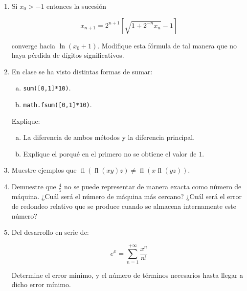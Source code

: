 \documentclass[
	spanish,
	9pt,
	utf8,
	xcolor=table,
	handout,
	aspectratio=1610,
	professionalfonts,
	notheorems,
	mathserif,
]{beamer}
\newcounter{savedenum}
\newcommand*{\resume}{\setcounter{enumi}{\thesavedenum}}
\begin{document}
\begin{frame}
	\begin{enumerate}
		\resume

		\item
		      Si $x_{0}>-1$ entonces la sucesión

		      \begin{equation*}
			      x_{n+1}=
			      2^{n+1}\left[\sqrt{1+2^{-n}x_{n}}-1\right]
		      \end{equation*}

		      converge hacia $\ln\left(x_{0}+1\right)$.
		      Modifique esta fórmula de tal manera que no haya pérdida de dígitos significativos.

		\item
		      En clase se ha visto distintas formas de sumar:

		      \begin{multicols}{2}
			      \begin{enumerate}[a)]
				      \item
				            \texttt{sum([0,1]*10)}.

				      \item
				            \texttt{math.fsum([0,1]*10)}.
			      \end{enumerate}
		      \end{multicols}

		      Explique:

		      \begin{multicols}{2}
			      \begin{enumerate}[a)]
				      \item La diferencia de ambos métodos y la diferencia principal.
				      \item Explique el porqué en el primero no se obtiene el valor de $1$.
			      \end{enumerate}
		      \end{multicols}

		\item
		      Muestre ejemplos que $\operatorname{fl}\left(\operatorname{fl}\left(xy\right)z\right)\neq\operatorname{fl}\left(x\operatorname{fl}\left(yz\right)\right)$.

		\item
		      Demuestre que $\frac{4}{5}$ no se puede representar de manera exacta como número de máquina.
		      ¿Cuál será el número de máquina más cercano?
		      ¿Cuál será el error de redondeo relativo que se produce
		      cuando se almacena internamente este número?

		\item
		      Del desarrollo en serie de:

		      \begin{equation*}
			      e^{x}=
			      \sum_{n=1}^{+\infty}
			      \frac{x^{n}}{n!}
		      \end{equation*}

		      Determine el error minimo, y el número de términos necesarios hasta llegar a dicho error mínimo.

	\end{enumerate}
\end{frame}
\end{document}
